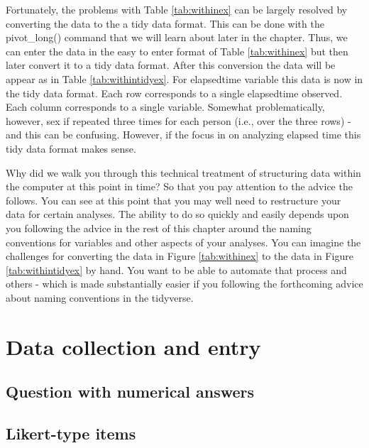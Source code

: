 \documentclass[
]{krantz}
\begin{document}
Fortunately, the problems with Table \ref{tab:withinex} can be largely resolved by converting the data to the a tidy data format. This can be done with the pivot\_long() command that we will learn about later in the chapter. Thus, we can enter the data in the easy to enter format of Table \ref{tab:withinex} but then later convert it to a tidy data format. After this conversion the data will be appear as in Table \ref{tab:withintidyex}. For elapsedtime variable this data is now in the tidy data format. Each row corresponds to a single elapsedtime observed. Each column corresponds to a single variable. Somewhat problematically, however, sex if repeated three times for each person (i.e., over the three rows) - and this can be confusing. However, if the focus in on analyzing elapsed time this tidy data format makes sense.

Why did we walk you through this technical treatment of structuring data within the computer at this point in time? So that you pay attention to the advice the follows. You can see at this point that you may well need to restructure your data for certain analyses. The ability to do so quickly and easily depends upon you following the advice in the rest of this chapter around the naming conventions for variables and other aspects of your analyses. You can imagine the challenges for converting the data in Figure \ref{tab:withinex} to the data in Figure \ref{tab:withintidyex} by hand. You want to be able to automate that process and others - which is made substantially easier if you following the forthcoming advice about naming conventions in the tidyverse.

\hypertarget{data-collection-and-entry}{%
\section{Data collection and entry}\label{data-collection-and-entry}}

\hypertarget{question-with-numerical-answers}{%
\subsection{Question with numerical answers}\label{question-with-numerical-answers}}

\hypertarget{likert-type-items}{%
\subsection{Likert-type items}\label{likert-type-items}}
\end{document}
